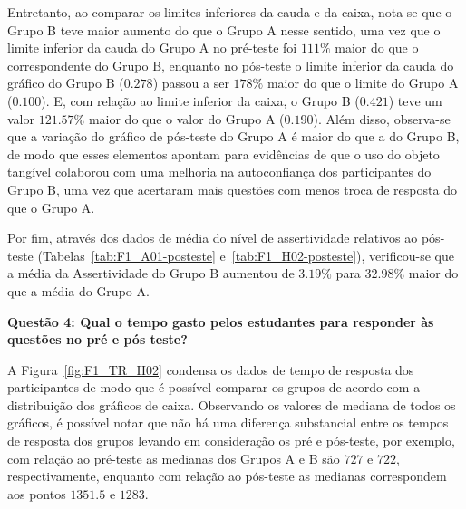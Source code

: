 Entretanto, ao comparar os limites inferiores da cauda e da caixa, nota-se que o Grupo B teve maior aumento do que o Grupo A nesse sentido, uma vez que o limite inferior da cauda do Grupo A no pré-teste foi $111\%$ maior do que o correspondente do Grupo B, enquanto no pós-teste o limite inferior da cauda do gráfico do Grupo B ($0.278$) passou a ser $178\%$ maior do que o limite do Grupo A ($0.100$). E, com relação ao limite inferior da caixa, o Grupo B ($0.421$) teve um valor $121.57\%$ maior do que o valor do Grupo A ($0.190$). Além disso, observa-se que a variação do gráfico de pós-teste do Grupo A é maior do que a do Grupo B, de modo que esses elementos apontam para evidências de que o uso do objeto tangível colaborou com uma melhoria na autoconfiança dos participantes do Grupo B, uma vez que acertaram mais questões com menos troca de resposta do que o Grupo A.

Por fim, através dos dados de média do nível de assertividade relativos ao pós-teste (Tabelas~\ref{tab:F1_A01-posteste} e~\ref{tab:F1_H02-posteste}), verificou-se que a média da Assertividade do Grupo B aumentou de $3.19\%$ para $32.98\%$ maior do que a média do Grupo A.


\textbf{Questão 4: Qual o tempo gasto pelos estudantes para responder às questões no pré e pós teste?}

A Figura~\ref{fig:F1_TR_H02} condensa os dados de tempo de resposta dos participantes de modo que é possível comparar os grupos de acordo com a distribuição dos gráficos de caixa. Observando os valores de mediana de todos os gráficos, é possível notar que não há uma diferença substancial entre os tempos de resposta dos grupos levando em consideração os pré e pós-teste, por exemplo, com relação ao pré-teste as medianas dos Grupos A e B são $727$ e $722$, respectivamente, enquanto com relação ao pós-teste as medianas correspondem aos pontos $1351.5$ e $1283$.

